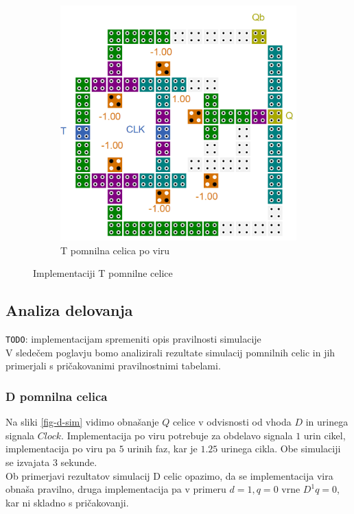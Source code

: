 \documentclass[a4paper, 11pt]{article}
\newcommand{\todo}{\textcolor{BrickRed}{\texttt{TODO}}} %
\begin{document}
\begin{figure}[h!]
\begin{subfigure}[b]{0.4\textwidth}
	\includegraphics[width=\textwidth]{../img/vir_5/t.png} 
	\caption{T pomnilna celica po viru \cite{a_novel_approach}}
	\label{fig-t-2}
	\end{subfigure}
	\caption{Implementaciji T pomnilne celice}
	\label{fig-t}
\end{figure}


\subsection{Analiza delovanja}
\todo: implementacijam spremeniti opis pravilnosti simulacije\\
V sledečem poglavju bomo analizirali rezultate simulacij pomnilnih celic in jih primerjali s pričakovanimi pravilnostnimi tabelami.\\

\subsubsection{D pomnilna celica}
Na sliki \ref{fig-d-sim} vidimo obnašanje $Q$ celice v odvisnosti od vhoda $D$ in urinega signala $Clock$.
Implementacija po viru \cite{quantum_dot} potrebuje za obdelavo signala $1$ urin cikel, implementacija po viru \cite{a_novel_approach} pa $5$ urinih faz, kar je $1.25$ urinega cikla. Obe simulaciji se izvajata $3$ sekunde.\\
Ob primerjavi rezultatov simulacij D celic opazimo, da se implementacija vira \cite{quantum_dot} obnaša pravilno, druga implementacija pa v primeru $d=1, q=0$ vrne $D^1q=0$, kar ni skladno s pričakovanji.
\end{document}
